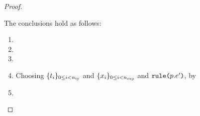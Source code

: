 \begin{proof}
\begin{grayparbox}
\begin{enumerate}
\begin{byCases}
    The conclusions hold as follows:
    \begin{enumerate}
      \item {}
      \item {}
      \item {}
      \item Choosing $\{t_i\}_{0 \leq i < n_\text{ty}}$ and $\{x_i\}_{0 \leq i < n_\text{exp}}$ and $\texttt{rule}\texttt{(}p.e'\texttt{)}$, by 
      \item {}
    \end{enumerate}
    \resetpfcounter
  \end{byCases}
\end{enumerate}
\end{grayparbox}
\end{proof}

